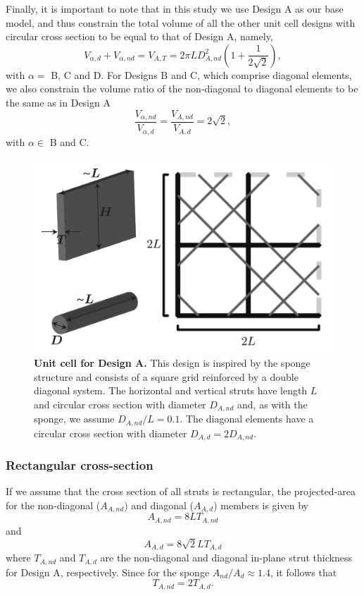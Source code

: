 \documentclass[10pt,twoside]{fernandes_supp}
\begin{document}
Finally, it is important to note that in this study we use Design A as our base model, and thus constrain the total volume of all the other unit cell designs with circular cross section to be equal to that of Design A, namely,
\begin{equation}\label{con1}
V_{\alpha,d}+V_{\alpha,nd}={V}_{A,T}=2\pi L D_{A,nd}^2 \left(1+\frac{1}{2\sqrt{2}}\right),
\end{equation}
with $\alpha=$ B, C and D.
For Designs B and C, which comprise diagonal elements, we also  constrain the volume ratio of the non-diagonal to diagonal elements to be the same as in Design A
\begin{equation}\label{con2}
\frac{V_{\alpha,nd}}{V_{\alpha,d}}=\frac{V_{A,nd}}{V_{A,d}}=2\sqrt{2},
\end{equation}
with $\alpha\in$ B and C.

\begin{figure}[H]
    \centering
    \includegraphics[width=0.5\linewidth]{SFig2}
    \caption{{\bf Unit cell for Design A.} This design is inspired by the sponge structure and consists of a square grid  reinforced by a double diagonal system. The horizontal and vertical struts have length $L$ and circular cross section with diameter $D_{A,nd}$ and, as with the sponge, we assume $D_{A,nd}/L=0.1$. The diagonal elements have a circular cross section  with diameter $D_{A,d}=2 D_{A,nd}$.}
    \label{DesignA}
\end{figure}

\subsubsection{Rectangular cross-section}

If we assume that the cross section of all struts is rectangular, the projected-area  for the non-diagonal ($A_{A,nd}$) and diagonal ($A_{A,d}$) members is given by
\begin{equation}
	A_{A,nd}=8LT_{A,nd}
\end{equation}
and
\begin{equation}
	A_{A,d}=8\sqrt{2}LT_{A,d}
\end{equation}
where  $T_{A,nd}$ and $T_{A,d}$ are the non-diagonal and diagonal in-plane strut thickness for Design A, respectively.
Since for the sponge   $A_{nd}/A_d\approx 1.4$, it follows that
\begin{equation}
	T_{A,nd}=2T_{A,d}.
\end{equation}
\end{document}

